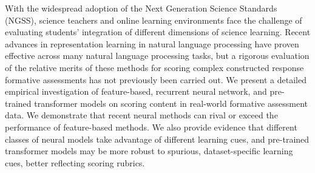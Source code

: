 With the widespread adoption of the Next Generation Science Standards (NGSS), science teachers and online learning environments face the challenge of evaluating students' integration of different dimensions of science learning. Recent advances in representation learning in natural language processing have proven effective across many natural language processing tasks, but a rigorous evaluation of the relative merits of these methods for scoring complex constructed response formative assessments has not previously been carried out. We present a detailed empirical investigation of feature-based, recurrent neural network, and pre-trained transformer models on scoring content in real-world formative assessment data. We demonstrate that recent neural methods can rival or exceed the performance of feature-based methods. We also provide evidence that different classes of neural models take advantage of different learning cues, and pre-trained transformer models may be more robust to spurious, dataset-specific learning cues, better reflecting scoring rubrics.
